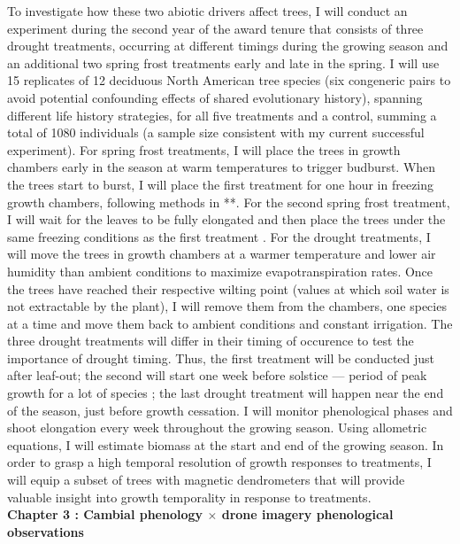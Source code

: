 \documentclass[12pt]{article}
\begin{document}
To investigate how these two abiotic drivers affect trees, I will conduct an experiment during the second year of the award tenure that consists of three drought treatments, occurring at different timings during the growing season and an additional two spring frost treatments early and late in the spring. I will use 15 replicates of 12 deciduous North American tree species (six congeneric pairs to avoid potential confounding effects of shared evolutionary history), spanning different life history strategies, for all five treatments and a control, summing a total of 1080 individuals (a sample size consistent with my current successful experiment). For spring frost treatments, I will place the trees in growth chambers early in the season at warm temperatures to trigger budburst. When the trees start to burst, I will place the first treatment for one hour in freezing growth chambers, following methods in \citet{chamberlain_late_2021}**. For the second spring frost treatment, I will wait for the leaves to be fully elongated and then place the trees under the same freezing conditions as the first treatment \cite{zohner_increased_2018}.
For the drought treatments, I will move the trees in growth chambers at a warmer temperature and lower air humidity than ambient conditions to maximize evapotranspiration rates. Once the trees have reached their respective wilting point (values at which soil water is not extractable by the plant), I will remove them from the chambers, one species at a time and move them back to ambient conditions and constant irrigation. The three drought treatments will differ in their timing of occurence to test the importance of drought timing. Thus, the first treatment will be conducted just after leaf-out; the second will start one week before solstice --- period of peak growth for a lot of species \cite{anderson-teixeira_carbon_2021,dorangeville_drought_2018,mcmahon_general_2015}; the last drought treatment will happen near the end of the season, just before growth cessation. I will monitor phenological phases and shoot elongation every week throughout the growing season. Using allometric equations, I will estimate biomass at the start and end of the growing season. In order to grasp a high temporal resolution of growth responses to treatments, I will equip a subset of trees with magnetic dendrometers that will provide valuable insight into growth temporality in response to treatments. \\
\textbf{Chapter 3 : Cambial phenology $\times$ drone imagery phenological observations}
\end{document}

